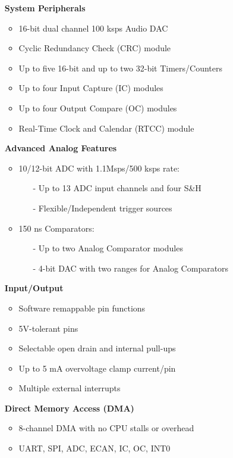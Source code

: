 \documentclass[11pt,a4paper,oneside]{article}
\begin{document}
\begin{itemize}
\item [] \textbf{System Peripherals}
  \begin{itemize}
  \item  16-bit dual channel 100 ksps Audio DAC                 
  \item  Cyclic Redundancy Check (CRC) module                   
  \item  Up to five 16-bit and up to two 32-bit Timers/Counters 
  \item  Up to four Input Capture (IC) modules                  
  \item  Up to four Output Compare (OC) modules                 
  \item  Real-Time Clock and Calendar (RTCC) module             
\end{itemize}

\item [] \textbf{Advanced Analog Features}
\begin{itemize}
\item 10/12-bit ADC with 1.1Msps/500 ksps rate:
  \begin{itemize}
  \item [-] Up to 13 ADC input channels and four S\&H
  \item [-] Flexible/Independent trigger sources
  \end{itemize}
\item 150 ns Comparators:
  \begin{itemize}
  \item [-] Up to two Analog Comparator modules
  \item [-] 4-bit DAC with two ranges for Analog Comparators
  \end{itemize}
\end{itemize}

\item [] \textbf{Input/Output}
  \begin{itemize}
  \item Software remappable pin functions          
  \item 5V-tolerant pins                           
  \item Selectable open drain and internal pull-ups
  \item Up to 5 mA overvoltage clamp current/pin   
  \item Multiple external interrupts                   
  \end{itemize}

\item [] \textbf{Direct Memory Access (DMA)}
  \begin{itemize}
  \item 8-channel DMA with no CPU stalls or overhead
  \item UART, SPI, ADC, ECAN, IC, OC, INT0
  \end{itemize}


\end{itemize}
\end{document}
